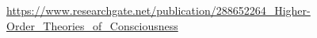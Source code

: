 \documentclass[a4paper]{article}
\title{}
\date{}
\begin{document}
\maketitle
    \url{https://www.researchgate.net/publication/288652264_Higher-Order_Theories_of_Consciousness}
\end{document}
